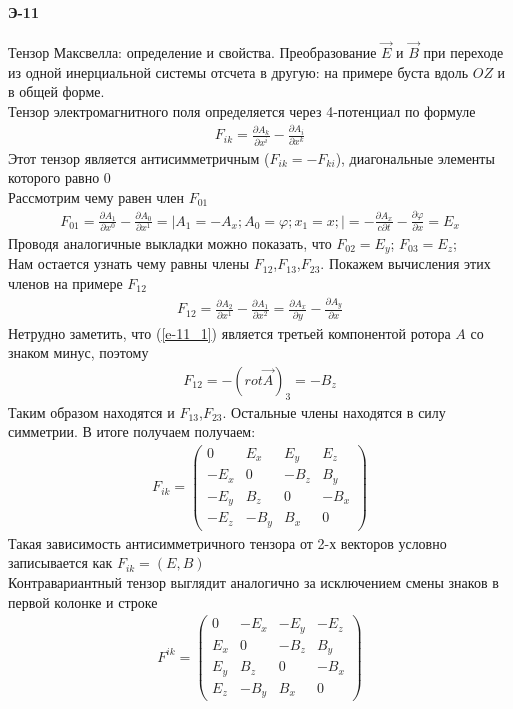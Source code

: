 



\paragraph{Э-11}
Тензор Максвелла: определение и свойства. Преобразование $\vec E$ и $\vec B$ при переходе из одной инерциальной системы отсчета в другую: на примере буста вдоль $OZ$ и в общей форме.\\

Тензор электромагнитного поля определяется через 4-потенциал по формуле
\begin{gather*}
	F_{ik} = \frac{\partial A_k}{\partial x^i}-\frac{\partial A_i}{\partial x^k}
\end{gather*}
Этот тензор является антисимметричным ($F_{ik}=-F_{ki}$), диагональные элементы которого равно 0\\
Рассмотрим чему равен член $F_{01}$
\begin{gather*}
F_{01} = \frac{\partial A_1}{\partial x^0}-\frac{\partial A_0}{\partial x^1}=\bigg|A_1=-A_x;A_0=\varphi;x_1=x;\bigg|= -\frac{\partial A_x}{c\partial t}-\frac{\partial \varphi}{\partial x} = E_x
\end{gather*}
Проводя аналогичные выкладки можно показать, что $\displaystyle F_{02} = E_y$; $\displaystyle F_{03} = E_z$;\\
Нам остается узнать чему равны члены $F_{12}$,$F_{13}$,$F_{23}$. Покажем вычисления этих членов на примере $F_{12}$  
\begin{gather}
\label{e-11_1}
	F_{12} = \frac{\partial A_2}{\partial x^1}-\frac{\partial A_1}{\partial x^2} = \frac{\partial A_x}{\partial y}-\frac{\partial A_y}{\partial x}
\end{gather}
Нетрудно заметить, что (\ref{e-11_1}) является третьей компонентой ротора $A$ со знаком минус, поэтому 
\begin{gather*}
	F_{12} = -\left(rot\vec A\right)_3=-B_z
\end{gather*}
Таким образом находятся и  $F_{13}$,$F_{23}$. Остальные члены находятся в силу симметрии. В итоге получаем получаем:
\begin{gather*}
	F_{ik} = \begin{pmatrix}
	0 & E_x & E_y & E_z \\
	-E_x & 0 & -B_z & B_y \\         
	-E_y & B_z & 0 & -B_x \\
	-E_z & -B_y & B_x & 0
	\end{pmatrix}
\end{gather*}
Такая зависимость антисимметричного тензора от 2-х векторов условно записывается как $F_{ik} = (E,B)$\\
Контравариантный тензор выглядит аналогично за исключением смены знаков в первой колонке и строке
\begin{gather*}
F^{ik} = \begin{pmatrix}
0 & -E_x & -E_y & -E_z \\
E_x & 0 & -B_z & B_y \\         
E_y & B_z & 0 & -B_x \\
E_z & -B_y & B_x & 0
\end{pmatrix}
\end{gather*}

